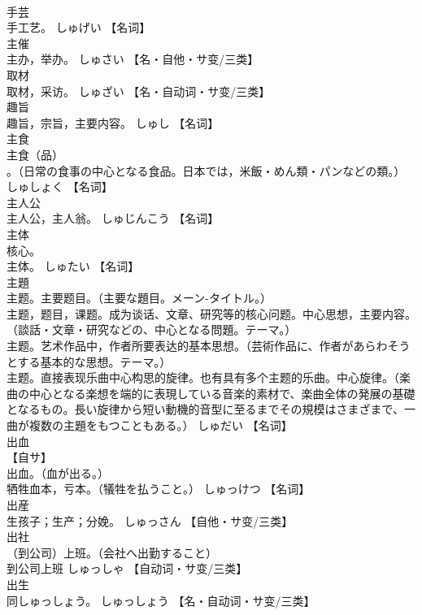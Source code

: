 \documentclass[8pt]{extreport}
\begin{document}
\begin{CJK}{UTF8}{min}
\\	手芸	
\\	手工艺。	しゅげい		【名词】
\\	主催	
\\	主办，举办。	しゅさい		【名・自他・サ变/三类】
\\	取材	
\\	取材，采访。	しゅざい		【名・自动词・サ变/三类】
\\	趣旨	
\\	趣旨，宗旨，主要内容。	しゅし		【名词】
\\	主食	
\\	主食（品）
\\	。（日常の食事の中心となる食品。日本では，米飯・めん類・パンなどの類。）	しゅしょく		【名词】
\\	主人公	
\\	主人公，主人翁。	しゅじんこう		【名词】
\\	主体	
\\	核心。 
\\	主体。	しゅたい		【名词】
\\	主題	
\\	主题。主要题目。（主要な題目。メーン-タイトル。） 
\\	主题，题目，课题。成为谈话、文章、研究等的核心问题。中心思想，主要内容。（談話・文章・研究などの、中心となる問題。テーマ。） 
\\	主题。艺术作品中，作者所要表达的基本思想。（芸術作品に、作者があらわそうとする基本的な思想。テーマ。） 
\\	主题。直接表现乐曲中心构思的旋律。也有具有多个主题的乐曲。中心旋律。（楽曲の中心となる楽想を端的に表現している音楽的素材で、楽曲全体の発展の基礎となるもの。長い旋律から短い動機的音型に至るまでその規模はさまざまで、一曲が複数の主題をもつこともある。）	しゅだい		【名词】
\\	出血	
\\	【自サ】 
\\	出血。（血が出る。） 
\\	牺牲血本，亏本。（犠牲を払うこと。）	しゅっけつ		【名词】
\\	出産	
\\	生孩子；生产；分娩。	しゅっさん		【自他・サ变/三类】
\\	出社	
\\	（到公司）上班。（会社へ出勤すること） 
\\	到公司上班	しゅっしゃ		【自动词・サ变/三类】
\\	出生	
\\	同しゅっしょう。	しゅっしょう		【名・自动词・サ变/三类】

\end{CJK}
\end{document}
